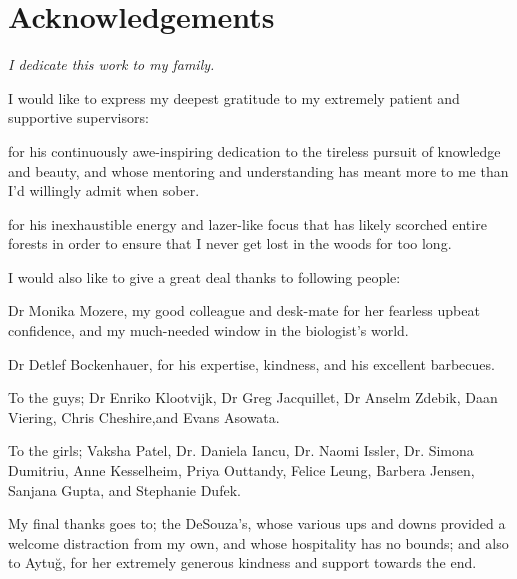 \chapter*{Acknowledgements}
\vfill
\textit{\large I dedicate this work to my family.}

\vfill

\noindent
I would like to express my deepest gratitude to my extremely patient and supportive supervisors:
\vspace{-5pt}
\begin{description}[labelsep=0.5em, align=left, labelwidth=0em, labelindent=1em, leftmargin=0em]
\item[\bf Dr Horia Stanescu]{for his continuously awe-inspiring dedication to the tireless pursuit of knowledge and beauty, and whose mentoring and understanding has meant more to me than I'd willingly admit when sober.}
\item[\bf Prof Robert Kleta]{for his inexhaustible energy and lazer-like focus that has likely scorched entire forests in order to ensure that I never get lost in the woods for too long.}
\end{description}

\vfill
\begin{spacing}{1.3}
\noindent
I would also like to give a great deal thanks to following people:

\begin{description}[labelsep=0.5em, align=left, labelwidth=0em, labelindent=1em, leftmargin=0em]
\item{Dr Monika Mozere, my good colleague and desk-mate for her fearless upbeat confidence, and my much-needed window in the biologist's world.}
\item{Dr Detlef Bockenhauer, for his expertise, kindness, and his excellent barbecues.}
\item{To the guys; Dr Enriko Klootvijk, Dr Greg Jacquillet, Dr Anselm Zdebik, Daan Viering, Chris Cheshire,and Evans Asowata.}
\item{To the girls; Vaksha Patel, Dr. Daniela Iancu, Dr. Naomi Issler, Dr. Simona Dumitriu, Anne Kesselheim, Priya Outtandy, Felice Leung, Barbera Jensen, Sanjana Gupta, and Stephanie Dufek.}
\end{description}
\end{spacing}

\vfill
\noindent
My final thanks goes to; the DeSouza's, whose various ups and downs provided a welcome distraction from my own, and whose hospitality has no bounds; and also to Aytu\u{g}, for her extremely generous kindness and support towards the end.